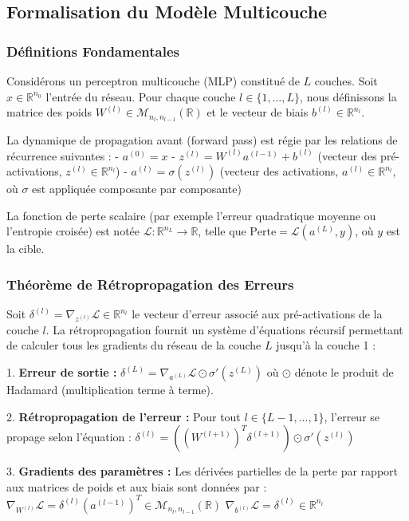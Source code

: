 \documentclass[11pt,a4paper]{article}
\begin{document}
\subsection{Formalisation du Modèle Multicouche}

\subsubsection{Définitions Fondamentales}

Considérons un perceptron multicouche (MLP) constitué de $L$ couches. Soit $x \in \mathbb{R}^{n_0}$ l'entrée du réseau.
Pour chaque couche $l \in \{1, \dots, L\}$, nous définissons la matrice des poids $W^{(l)} \in \mathcal{M}_{n_l, n_{l-1}}(\mathbb{R})$ et le vecteur de biais $b^{(l)} \in \mathbb{R}^{n_l}$.

La dynamique de propagation avant (forward pass) est régie par les relations de récurrence suivantes :
- $a^{(0)} = x$
- $z^{(l)} = W^{(l)} a^{(l-1)} + b^{(l)}$ (vecteur des pré-activations, $z^{(l)} \in \mathbb{R}^{n_l}$)
- $a^{(l)} = \sigma(z^{(l)})$ (vecteur des activations, $a^{(l)} \in \mathbb{R}^{n_l}$, où $\sigma$ est appliquée composante par composante)

La fonction de perte scalaire (par exemple l'erreur quadratique moyenne ou l'entropie croisée) est notée $\mathcal{L} : \mathbb{R}^{n_L} \to \mathbb{R}$, telle que $\text{Perte} = \mathcal{L}(a^{(L)}, y)$, où $y$ est la cible.

\subsubsection{Théorème de Rétropropagation des Erreurs}

Soit $\delta^{(l)} = \nabla_{z^{(l)}} \mathcal{L} \in \mathbb{R}^{n_l}$ le vecteur d'erreur associé aux pré-activations de la couche $l$.
La rétropropagation fournit un système d'équations récursif permettant de calculer tous les gradients du réseau de la couche $L$ jusqu'à la couche 1 :

1. \textbf{Erreur de sortie :}
   $\delta^{(L)} = \nabla_{a^{(L)}} \mathcal{L} \odot \sigma'(z^{(L)})$
   où $\odot$ dénote le produit de Hadamard (multiplication terme à terme).

2. \textbf{Rétropropagation de l'erreur :}
   Pour tout $l \in \{L-1, \dots, 1\}$, l'erreur se propage selon l'équation :
   $\delta^{(l)} = \left( (W^{(l+1)})^T \delta^{(l+1)} \right) \odot \sigma'(z^{(l)})$

3. \textbf{Gradients des paramètres :}
   Les dérivées partielles de la perte par rapport aux matrices de poids et aux biais sont données par :
   $\nabla_{W^{(l)}} \mathcal{L} = \delta^{(l)} (a^{(l-1)})^T \in \mathcal{M}_{n_l, n_{l-1}}(\mathbb{R})$
   $\nabla_{b^{(l)}} \mathcal{L} = \delta^{(l)} \in \mathbb{R}^{n_l}$
\end{document}
